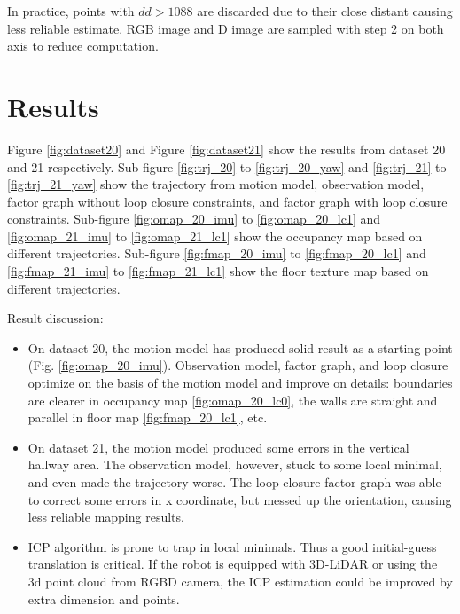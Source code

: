 \documentclass[conference]{IEEEtran}
\begin{document}
In practice, points with $dd > 1088$ are discarded due to 
their close distant causing less reliable estimate.
RGB image and D image are sampled with step 2 on both axis 
to reduce computation.


\section{Results}
Figure \ref*{fig:dataset20} and Figure \ref*{fig:dataset21} show 
the results from dataset 20 and 21 respectively.
Sub-figure \ref*{fig:trj_20} to \ref*{fig:trj_20_yaw} and 
\ref*{fig:trj_21} to \ref*{fig:trj_21_yaw} show
the trajectory from motion model, observation model, 
factor graph without loop closure constraints, 
and factor graph with loop closure constraints.
Sub-figure \ref*{fig:omap_20_imu} to \ref*{fig:omap_20_lc1} and 
\ref*{fig:omap_21_imu} to \ref*{fig:omap_21_lc1} show
the occupancy map based on different trajectories.
Sub-figure \ref*{fig:fmap_20_imu} to \ref*{fig:fmap_20_lc1} and 
\ref*{fig:fmap_21_imu} to \ref*{fig:fmap_21_lc1} show
the floor texture map based on different trajectories.

Result discussion:
\begin{itemize}
    \item On dataset 20, 
    the motion model has produced solid result as a starting point (Fig. \ref*{fig:omap_20_imu}). 
    Observation model, factor graph, and loop closure optimize 
    on the basis of the motion model and improve on details: 
    boundaries are clearer in occupancy map \ref*{fig:omap_20_lc0},
    the walls are straight and parallel in floor map \ref*{fig:fmap_20_lc1}, 
    etc.
    \item On dataset 21,
    the motion model produced some errors in the vertical hallway area.
    The observation model, however, stuck to some local minimal, and even made the trajectory worse.
    The loop closure factor graph was able to correct some errors in x coordinate, 
    but messed up the orientation, causing less reliable mapping results.
    \item ICP algorithm is prone to trap in local minimals. 
    Thus a good initial-guess translation is critical. 
    If the robot is equipped with 3D-LiDAR or using the 3d point cloud from RGBD camera, 
    the ICP estimation could be improved by extra dimension and points.
\end{itemize}
\end{document}
